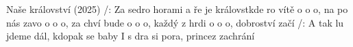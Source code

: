 \begin{TEXT}{Naše království (2025)}
\SLOKA /: Za sedro horami a  ře\NL
je  královstkde ro vítě
\REFREN {} o o o,  na po nás zavo\NL
{} o o o,  za chví bude \NL
{} o o o,  každý z  hrdi\NL
{} o o o,  dobroství začí
\SLOKA /: A tak lu jdeme dál, kdopak  se baby \NL
I s dra si pora,  princez zachrání
\REFRENHRAJ
\end{TEXT}
